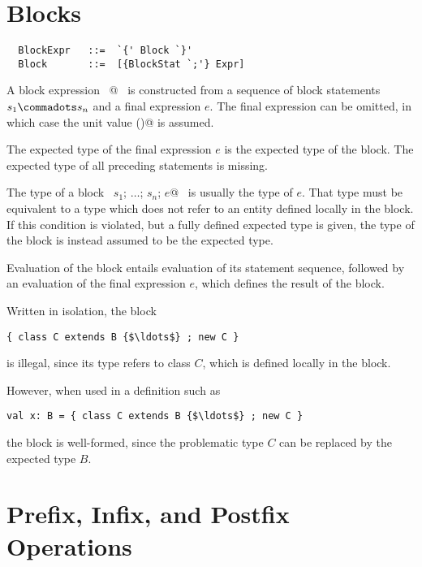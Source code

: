 \documentclass[a4paper,12pt,twoside,titlepage]{book}
\begin{document}
\section{Blocks}
\label{sec:blocks}

\syntax\begin{lstlisting}
  BlockExpr   ::=  `{' Block `}'
  Block       ::=  [{BlockStat `;'} Expr]
\end{lstlisting}

A block expression ~@~ is constructed from a
sequence of block statements $s_1 \commadots s_n$ and a final
expression $e$. The final expression can be omitted, in which
case the unit value \lstinline@()@ is assumed.


The expected type of the final expression $e$ is the expected
type of the block. The expected type of all preceding statements is
missing.

The type of a block ~\lstinline@$s_1$; $\ldots$; $s_n$; $e$@~ is usually the type of
$e$.  That type must be equivalent to a type which does not refer
to an entity defined locally in the block. If this condition is
violated, but a fully defined expected type is given, the type of the
block is instead assumed to be the expected type.

Evaluation of the block entails evaluation of its statement sequence,
followed by an evaluation of the final expression $e$, which
defines the result of the block.

\example
Written in isolation, 
the block 
\begin{lstlisting}
{ class C extends B {$\ldots$} ; new C }
\end{lstlisting}
is illegal, since its type
refers to class $C$, which is defined locally in the block.

However, when used in a definition such as 
\begin{lstlisting}
val x: B = { class C extends B {$\ldots$} ; new C }
\end{lstlisting}
the block is well-formed, since the problematic type $C$ can be
replaced by the expected type $B$.

\section{Prefix, Infix, and Postfix Operations}
\label{sec:infix-operations}
\end{document}
